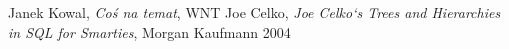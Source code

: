%
%

\clearpage
{}
{}
\begin{thebibliography}{99}
\thispagestyle{empty}

 Janek Kowal, 
    \emph{Coś na temat}, 
    WNT
 Joe Celko, 
    \emph{Joe Celko`s Trees and Hierarchies in SQL for Smarties}, 
    Morgan Kaufmann 2004

\end{thebibliography} 

